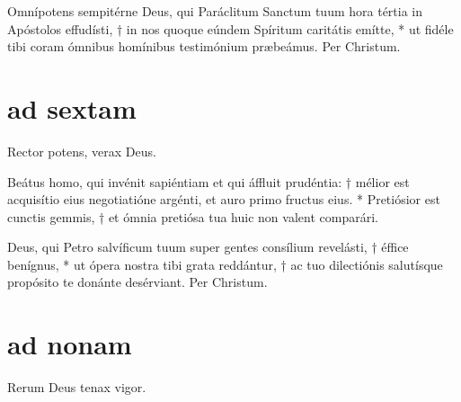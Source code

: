 Omnípotens sempitérne Deus, qui Paráclitum Sanctum tuum hora tértia in Apóstolos effudísti, † in nos quoque eúndem Spíritum cari­tátis emítte, * 
ut fidéle tibi coram ómnibus homínibus testimónium præbeámus. Per Christum.\\


\section[horae minores]{ad sextam}

 Rector potens, verax Deus.

\vspace{0.6cm}

\def\greinitialformat#1{{\fontsize{40}{40}\selectfont #1}}
\gresetfirstlineaboveinitial{\small \textcolor{red}{ Ps 1 2 6 }}{}
\setaboveinitialseparation{0.72mm}

\vspace{0.3cm}

Beátus homo, qui invénit sapiéntiam et qui áffluit prudéntia: † mélior est acquisítio eius negotiatióne argénti, et auro primo fructus eius. 
* Pretiósior est cunctis gemmis, † et ómnia pretiósa tua huic non valent comparári.\\


Deus, qui Petro salvíficum tuum super gentes consílium revelásti, † éffice benígnus, * 
ut ópera nostra tibi grata reddántur, † ac tuo dilectiónis salutísque propósito te donánte desérviant. Per Christum.\\





\section[horae minores]{ad nonam}

 Rerum Deus tenax vigor.

\def\greinitialformat#1{{\fontsize{40}{40}\selectfont #1}}
\gresetfirstlineaboveinitial{\small \textcolor{red}{ Ps 7 }}{}
\setaboveinitialseparation{0.72mm}

